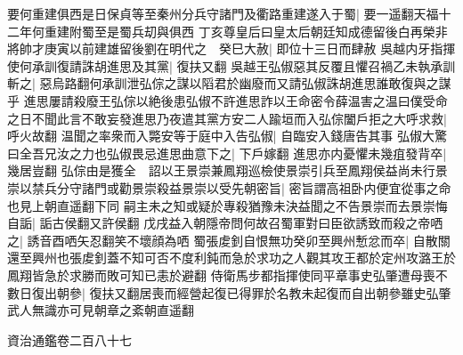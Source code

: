 要何重建俱西是日保貞等至秦州分兵守諸門及衢路重建遂入于蜀|{
	要一遥翻天福十二年何重建附蜀至是蜀兵刧與俱西}
丁亥尊皇后曰皇太后朝廷知成德留後白再榮非將帥才庚寅以前建雄留後劉在明代之　癸巳大赦|{
	即位十三日而肆赦}
吳越内牙指揮使何承訓復請誅胡進思及其黨|{
	復扶又翻}
吳越王弘俶惡其反覆且懼召禍乙未執承訓斬之|{
	惡烏路翻何承訓泄弘倧之謀以䧟君於幽廢而又請弘俶誅胡進思誰敢復與之謀乎}
進思屢請殺廢王弘倧以絶後患弘俶不許進思詐以王命密令薛温害之温曰僕受命之日不聞此言不敢妄發進思乃夜遣其黨方安二人踰垣而入弘倧闔戶拒之大呼求救|{
	呼火故翻}
温聞之率衆而入斃安等于庭中入告弘俶|{
	自臨安入錢唐告其事}
弘俶大驚曰全吾兄汝之力也弘俶畏忌進思曲意下之|{
	下戶嫁翻}
進思亦内憂懼未幾疽發背卒|{
	幾居豈翻}
弘倧由是獲全　詔以王景崇兼鳳翔巡檢使景崇引兵至鳳翔侯益尚未行景崇以禁兵分守諸門或勸景崇殺益景崇以受先朝密旨|{
	密旨謂高祖卧内便宜從事之命也見上朝直遥翻下同}
嗣主未之知或疑於專殺猶豫未決益聞之不告景崇而去景崇悔自詬|{
	詬古侯翻又許侯翻}
戊戌益入朝隱帝問何故召蜀軍對曰臣欲誘致而殺之帝哂之|{
	誘音酉哂矢忍翻笑不壞顔為哂}
蜀張䖍釗自恨無功癸卯至興州慙忿而卒|{
	自散關還至興州也張䖍釗蓋不知可否不度利鈍而急於求功之人觀其攻王都於定州攻潞王於鳳翔皆急於求勝而敗可知已恚於避翻}
侍衛馬步都指揮使同平章事史弘肇遭母喪不數日復出朝參|{
	復扶又翻居喪而經營起復已得罪於名教未起復而自出朝參雖史弘肇武人無識亦可見朝章之紊朝直遥翻}


資治通鑑卷二百八十七
